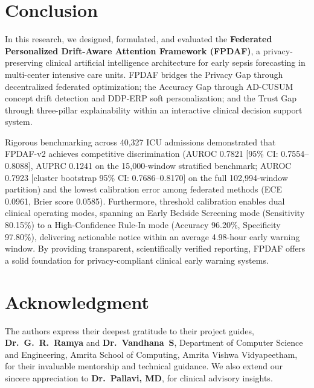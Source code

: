 \documentclass[journal,twocolumn,10pt]{IEEEtran}
\begin{document}
\section{Conclusion}
In this research, we designed, formulated, and evaluated the \textbf{Federated Personalized Drift-Aware Attention Framework (FPDAF)}, a privacy-preserving clinical artificial intelligence architecture for early sepsis forecasting in multi-center intensive care units. FPDAF bridges the Privacy Gap through decentralized federated optimization; the Accuracy Gap through AD-CUSUM concept drift detection and DDP-ERP soft personalization; and the Trust Gap through three-pillar explainability within an interactive clinical decision support system.

Rigorous benchmarking across 40,327 ICU admissions demonstrated that FPDAF-v2 achieves competitive discrimination (AUROC 0.7821 [95\% CI: 0.7554--0.8088], AUPRC 0.1241 on the 15,000-window stratified benchmark; AUROC 0.7923 [cluster bootstrap 95\% CI: 0.7686--0.8170] on the full 102,994-window partition) and the lowest calibration error among federated methods (ECE 0.0961, Brier score 0.0585). Furthermore, threshold calibration enables dual clinical operating modes, spanning an Early Bedside Screening mode (Sensitivity 80.15\%) to a High-Confidence Rule-In mode (Accuracy 96.20\%, Specificity 97.80\%), delivering actionable notice within an average 4.98-hour early warning window. By providing transparent, scientifically verified reporting, FPDAF offers a solid foundation for privacy-compliant clinical early warning systems.

\section*{Acknowledgment}
The authors express their deepest gratitude to their project guides, \textbf{Dr.~G.~R.~Ramya} and \textbf{Dr.~Vandhana~S}, Department of Computer Science and Engineering, Amrita School of Computing, Amrita Vishwa Vidyapeetham, for their invaluable mentorship and technical guidance. We also extend our sincere appreciation to \textbf{Dr.~Pallavi, MD}, for clinical advisory insights.

\balance


\end{document}
